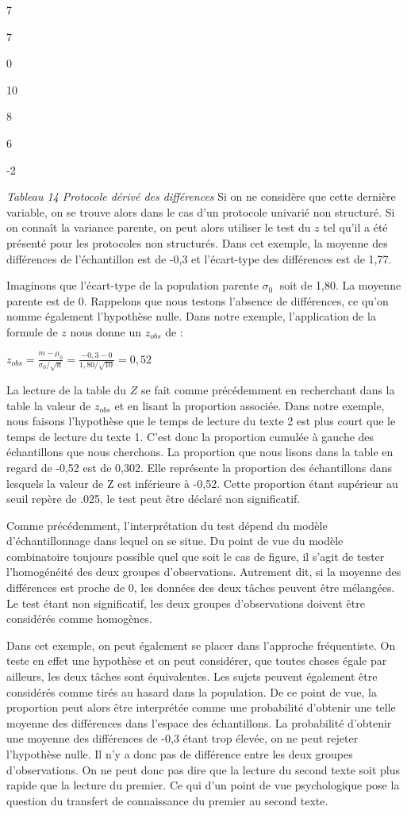 \documentclass[]{book}
\theoremstyle{definition}
\theoremstyle{definition}
\theoremstyle{definition}
\theoremstyle{remark}
\begin{document}
7

7

0

10

8

6

-2

\emph{Tableau 14 Protocole dérivé des différences} Si on ne considère
que cette dernière variable, on se trouve alors dans le cas d'un
protocole univarié non structuré. Si on connaît la variance parente, on
peut alors utiliser le test du \(z\) tel qu'il a été présenté pour les
protocoles non structurés. Dans cet exemple, la moyenne des différences
de l'échantillon est de -0,3 et l'écart-type des différences est de
1,77.

Imaginons que l'écart-type de la population parente \(\sigma_{0}\) soit
de 1,80. La moyenne parente est de 0. Rappelons que nous testons
l'absence de différences, ce qu'on nomme également l'hypothèse nulle.
Dans notre exemple, l'application de la formule de \(z\) nous donne un
\(z_{obs}\) de :

\(z_{obs} = \frac{m-\mu _{0}}{\sigma _{0}/\sqrt{n}} = \frac{-0,3-0}{1,80/\sqrt{10}} = 0,52\)

La lecture de la table du \(Z\) se fait comme précédemment en
recherchant dans la table la valeur de \(z_{obs}\) et en lisant la
proportion associée. Dans notre exemple, nous faisons l'hypothèse que le
temps de lecture du texte 2 est plus court que le temps de lecture du
texte 1. C'est donc la proportion cumulée à gauche des échantillons que
nous cherchons. La proportion que nous lisons dans la table en regard de
-0,52 est de 0,302. Elle représente la proportion des échantillons dans
lesquels la valeur de Z est inférieure à -0,52. Cette proportion étant
supérieur au seuil repère de .025, le test peut être déclaré non
significatif.

Comme précédemment, l'interprétation du test dépend du modèle
d'échantillonnage dans lequel on se situe. Du point de vue du modèle
combinatoire toujours possible quel que soit le cas de figure, il s'agit
de tester l'homogénéité des deux groupes d'observations. Autrement dit,
si la moyenne des différences est proche de 0, les données des deux
tâches peuvent être mélangées. Le test étant non significatif, les deux
groupes d'observations doivent être considérés comme homogènes.

Dans cet exemple, on peut également se placer dans l'approche
fréquentiste. On teste en effet une hypothèse et on peut considérer, que
toutes choses égale par ailleurs, les deux tâches sont équivalentes. Les
sujets peuvent également être considérés comme tirés au hasard dans la
population. De ce point de vue, la proportion peut alors être
interprétée comme une probabilité d'obtenir une telle moyenne des
différences dans l'espace des échantillons. La probabilité d'obtenir une
moyenne des différences de -0,3 étant trop élevée, on ne peut rejeter
l'hypothèse nulle. Il n'y a donc pas de différence entre les deux
groupes d'observations. On ne peut donc pas dire que la lecture du
second texte soit plus rapide que la lecture du premier. Ce qui d'un
point de vue psychologique pose la question du transfert de connaissance
du premier au second texte.
\end{document}
